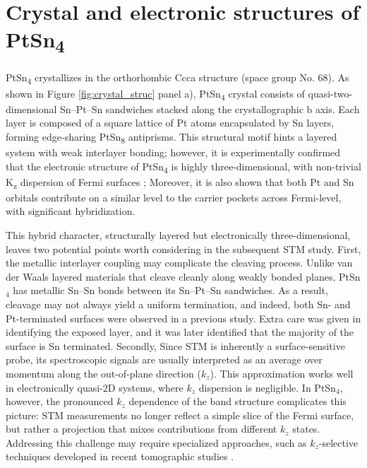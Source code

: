 \section{Crystal and electronic structures of PtSn\textsubscript{4}}

PtSn\textsubscript{4} crystallizes in the orthorhombic Ccca structure (space group No. 68). As shown in Figure \ref{fig:crystal_struc} panel a), PtSn\textsubscript{4} crystal consists of quasi-two-dimensional Sn–Pt–Sn sandwiches stacked along the crystallographic b axis. Each layer is composed of a square lattice of Pt atoms encapsulated by Sn layers, forming edge-sharing PtSn\textsubscript{8} antiprisms. This structural motif hints a layered system with weak interlayer bonding; however, it is experimentally confirmed that the electronic structure of PtSn\textsubscript{4} is highly three-dimensional, with non-trivial K\textsubscript{z} dispersion of Fermi surfaces  \cite{wuDiracNodeArcs2016}\cite{linUltrafastCarrierRelaxation2024}\cite{inamdarQuantumOscillationsUltra2013a}\cite{munMagneticFieldEffects2012}\cite{yaraSmallFermiSurfaces2018a}\cite{diazSemiclassicalOriginExtreme2024}; Moreover, it is also shown that both Pt and Sn orbitals contribute on a similar level to the carrier pockets across Fermi-level, with significant hybridization\cite{luoOriginExtremelyLarge2018}. 

This hybrid character, structurally layered but electronically three-dimensional, leaves two potential points worth considering in the subsequent \ac{STM} study. First, the metallic interlayer coupling may complicate the cleaving process. Unlike van der Waals layered materials that cleave cleanly along weakly bonded planes, PtSn$_4$ has metallic Sn–Sn bonds between its Sn–Pt–Sn sandwiches. As a result, cleavage may not always yield a uniform termination, and indeed, both Sn- and Pt-terminated surfaces were observed in a previous study\cite{liDiracNodalArc2019}. Extra care was given in identifying the exposed layer, and it was later identified that the majority of the surface is Sn terminated. Secondly, Since \ac{STM} is inherently a surface-sensitive probe, its spectroscopic signals are usually interpreted as an average over momentum along the out-of-plane direction ($k_z$). This approximation works well in electronically quasi-2D systems, where $k_z$ dispersion is negligible. In PtSn$_4$, however, the pronounced $k_z$ dependence of the band structure complicates this picture: STM measurements no longer reflect a simple slice of the Fermi surface, but rather a projection that mixes contributions from different $k_z$ states. Addressing this challenge may require specialized approaches, such as $k_z$-selective techniques developed in recent tomographic studies \cite{marquesTomographicMappingHidden2021}.

